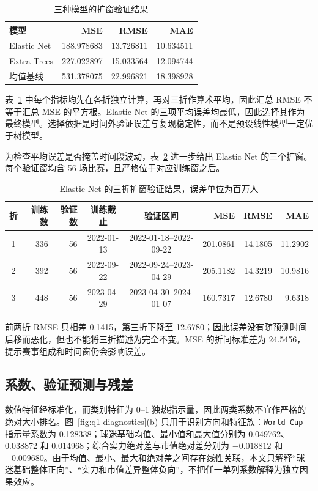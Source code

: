 \begin{longtable}[]{@{}lrrr@{}}
\caption{三种模型的扩窗验证结果}\label{tab:q1-model-comparison}\\
\toprule\noalign{}
模型 & MSE & RMSE & MAE \\
\midrule\noalign{}
\endhead
\bottomrule\noalign{}
\endlastfoot
Elastic Net & 188.978683 & 13.726811 & 10.634511 \\
Extra Trees & 227.022897 & 15.033564 & 12.094744 \\
均值基线 & 531.378075 & 22.996821 & 18.398928 \\
\end{longtable}

表~\ref{tab:q1-model-comparison} 中每个指标均先在各折独立计算，再对三折作算术平均，因此汇总 RMSE 不等于汇总 MSE 的平方根。Elastic Net 的三项平均误差均最低，因此选择其作为最终模型。选择依据是时间外验证误差与复现稳定性，而不是预设线性模型一定优于树模型。

为检查平均误差是否掩盖时间段波动，表~\ref{tab:q1-folds} 进一步给出 Elastic Net 的三个扩窗。每个验证窗均含 56 场比赛，且严格位于对应训练窗之后。

\begin{table}[htbp]
\centering
\caption{Elastic Net 的三折扩窗验证结果，误差单位为百万人}
\label{tab:q1-folds}
\small
\begin{tabular}{crrccrrr}
\toprule
折 & 训练数 & 验证数 & 训练截止 & 验证区间 & MSE & RMSE & MAE\\
\midrule
1 & 336 & 56 & 2022-01-13 & 2022-01-18--2022-09-22 & 201.0861 & 14.1805 & 11.2902\\
2 & 392 & 56 & 2022-09-22 & 2022-09-24--2023-04-29 & 205.1182 & 14.3219 & 10.9816\\
3 & 448 & 56 & 2023-04-29 & 2023-04-30--2024-01-07 & 160.7317 & 12.6780 & 9.6318\\
\bottomrule
\end{tabular}
\end{table}

前两折 RMSE 只相差 0.1415，第三折下降至 12.6780；因此误差没有随预测时间后移而恶化，但也不能将三折描述为完全不变。MSE 的折间标准差为 24.5456，提示赛事组成和时间窗仍会影响误差。

\subsection{系数、验证预测与残差}

数值特征经标准化，而类别特征为 0--1 独热指示量，因此两类系数不宜作严格的绝对大小排名。图~\ref{fig:q1-diagnostics}(b) 只用于识别方向和特征族：\texttt{World Cup} 指示量系数为 0.128338；球迷基础均值、最小值和最大值分别为 0.049762、0.038872 和 0.014968；综合实力绝对差与市值绝对差分别为 $-0.018812$ 和 $-0.009680$。由于均值、最小、最大和绝对差之间存在线性关联，本文只解释“球迷基础整体正向”、“实力和市值差异整体负向”，不把任一单列系数解释为独立因果效应。

